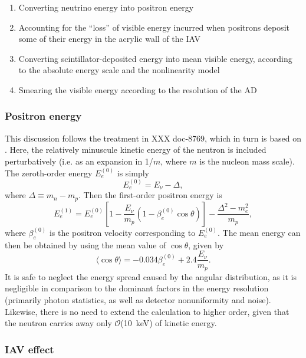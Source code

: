 \documentclass[../thesis.tex]{subfiles}
\begin{document}
\begin{enumerate}
\item Converting neutrino energy into positron energy
\item Accounting for the ``loss'' of visible energy incurred when positrons deposit some of their energy in the acrylic wall of the IAV
\item Converting scintillator-deposited energy into mean visible energy, according to the absolute energy scale and the nonlinearity model
\item Smearing the visible energy according to the resolution of the AD
\end{enumerate}

\subsubsection{Positron energy}

This discussion follows the treatment in XXX doc-8769, which in turn is based on \cite{Vogel_1999}. Here, the relatively minuscule kinetic energy of the neutron is included perturbatively (i.e. as an expansion in 1/$m$, where $m$ is the nucleon mass scale). The zeroth-order energy $E_e^{(0)}$ is simply
\begin{equation*}
  E_e^{(0)} = E_\nu - \Delta,
\end{equation*}
where $\Delta \equiv m_n - m_p$. Then the first-order positron energy is
\begin{equation*}
  E_e^{(1)} = E_e^{(0)} \left[ 1 - \frac{E_\nu}{m_p}(1 - \beta_e^{(0)}\cos\theta) \right]
  - \frac{\Delta^2 - m_e^2}{m_p},
\end{equation*}
where $\beta_e^{(0)}$ is the positron velocity corresponding to $E_e^{(0)}$. The mean energy can then be obtained by using the mean value of $\cos \theta$, given by \cite{Vogel_1999}
\begin{equation*}
  \langle \cos \theta \rangle = -0.034 \beta_e^{(0)} + 2.4 \frac{E_\nu}{m_p}.
\end{equation*}
It is safe to neglect the energy spread caused by the angular distribution, as it is negligible in comparison to the dominant factors in the energy resolution (primarily photon statistics, as well as detector nonuniformity and noise). Likewise, there is no need to extend the calculation to higher order, given that the neutron carries away only $\mathcal{O}$(10~keV) of kinetic energy.

\subsubsection{IAV effect}
\end{document}
